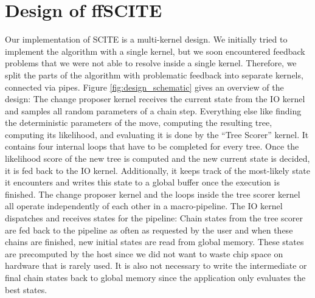 \chapter{Design of ffSCITE}

Our implementation of \ac{SCITE} is a multi-kernel design. We initially tried to implement the algorithm with a single kernel, but we soon encountered feedback problems that we were not able to resolve inside a single kernel. Therefore, we split the parts of the algorithm with problematic feedback into separate kernels, connected via pipes. Figure \ref{fig:design_schematic} gives an overview of the design: The change proposer kernel receives the current state from the IO kernel and samples all random parameters of a chain step. Everything else like finding the deterministic parameters of the move, computing the resulting tree, computing its likelihood, and evaluating it is done by the ``Tree Scorer'' kernel. It contains four internal loops that have to be completed for every tree. Once the likelihood score of the new tree is computed and the new current state is decided, it is fed back to the IO kernel. Additionally, it keeps track of the most-likely state it encounters and writes this state to a global buffer once the execution is finished. The change proposer kernel and the loops inside the tree scorer kernel all operate independently of each other in a macro-pipeline. The IO kernel dispatches and receives states for the pipeline: Chain states from the tree scorer are fed back to the pipeline as often as requested by the user and when these chains are finished, new initial states are read from global memory. These states are precomputed by the host since we did not want to waste chip space on hardware that is rarely used. It is also not necessary to write the intermediate or final chain states back to global memory since the application only evaluates the best states.

